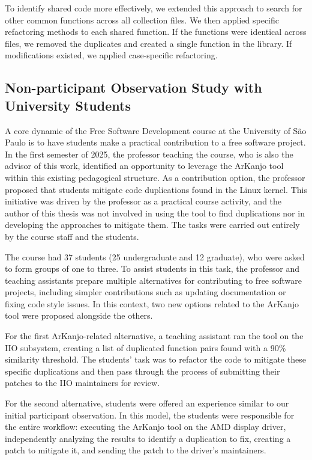 To identify shared code more effectively, we extended this approach to search for other common 
functions across all collection files. We then applied specific refactoring methods to each shared 
function. If the functions were identical across files, we removed the duplicates and created a single 
function in the library. If modifications existed, we applied case-specific refactoring.

\subsection{Non-participant Observation Study with University Students}

A core dynamic of the Free Software Development course at the University of São Paulo is to 
have students make a practical contribution to a free software project. In the first semester of 
2025, the professor teaching the course, who is also the advisor of this work, identified an 
opportunity to leverage the ArKanjo tool within this existing pedagogical structure. As a 
contribution option, the professor proposed that students mitigate code duplications found in the 
Linux kernel. This initiative was driven by the professor as a practical course activity, and 
the author of this thesis was not involved in using the tool to find duplications nor in developing 
the approaches to mitigate them. The tasks were carried out entirely by the course staff 
and the students.

The course had 37 students (25 undergraduate and 12 graduate), who were asked to form groups of 
one to three. To assist students in this task, the professor and teaching assistants prepare multiple 
alternatives for contributing to free software projects, including simpler contributions such as 
updating documentation or fixing code style issues. In this context, two new options related to the 
ArKanjo tool were proposed alongside the others.

For the first ArKanjo-related alternative, a teaching assistant ran the tool on the IIO subsystem, 
creating a list of duplicated function pairs found with a 90\% similarity threshold. The students' 
task was to refactor the code to mitigate these specific duplications and then pass through the process 
of submitting their patches to the IIO maintainers for review.

For the second alternative, students were offered an experience similar to our initial participant 
observation. In this model, the students were responsible for the entire workflow: executing the 
ArKanjo tool on the AMD display driver, independently analyzing the results to identify a duplication 
to fix, creating a patch to mitigate it, and sending the patch to the driver's maintainers.

